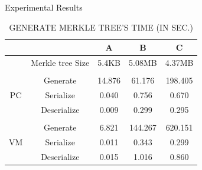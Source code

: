 \documentclass{beamer}
\begin{document}
\begin{CJK}{UTF8}{bkai}
\begin{frame}{Experimental Results}
\begin{table}[]
		\captionsetup{justification=centering}
		\caption{\tiny GENERATE MERKLE TREE'S TIME (IN SEC.)}
		\begin{tabular}{|c|c|c|c|c|}
			\hline
			   &				   &   A   &   B    &   C    \\ \hline
			   & Merkle tree Size & 5.4KB & 5.08MB & 4.37MB \\ \hline
			   &                  &       &        &        \\ \hline
			   & Generate         &14.876 &61.176  &198.405 \\ \cline{2-5} 
			PC & Serialize        & 0.040 & 0.756  & 0.670  \\ \cline{2-5} 
			   & Deserialize      & 0.009 & 0.299  & 0.295  \\ \hline
		   	   &                  &       &        &        \\ \hline
			   & Generate         & 6.821 &144.267 &620.151 \\ \cline{2-5} 
			VM & Serialize        & 0.011 & 0.343  & 0.299  \\ \cline{2-5} 
			   & Deserialize      & 0.015 & 1.016  & 0.860  \\
			\hline
		\end{tabular}
	\end{table}
\end{frame}


\end{CJK}
\end{document}
